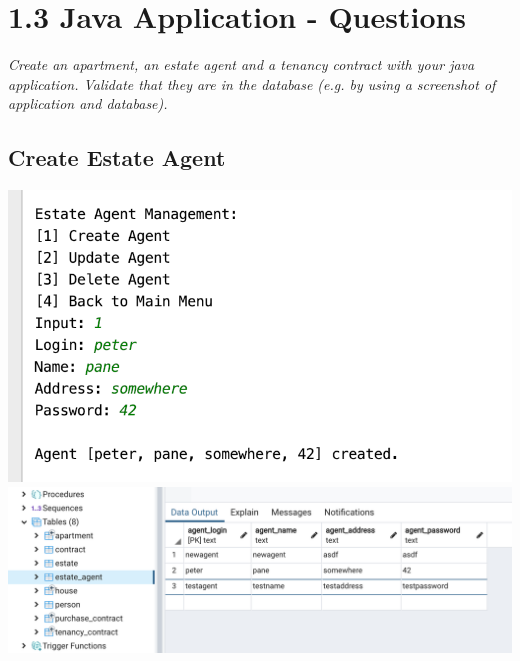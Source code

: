 \documentclass[ngerman]{dis-template-add}
\begin{document}
\section*{1.3 Java Application - Questions}

\textit{Create an apartment, an estate agent and a tenancy contract with your java application. Validate that they are in the database (e.g. by using a screenshot of application and database).}

\subsection*{Create Estate Agent}
\includegraphics[scale=.5]{agent_app} \\
\includegraphics[scale=.5]{agent_db}
\end{document}
